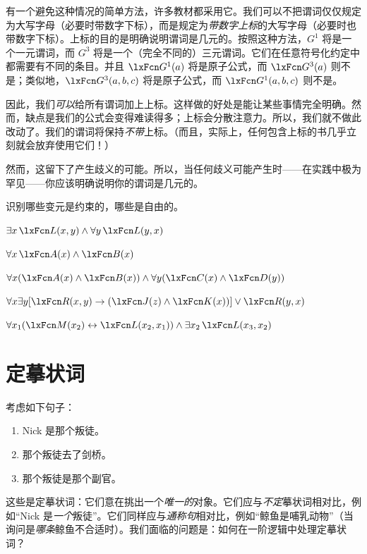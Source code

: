 有一个避免这种情况的简单方法，许多教材都采用它。我们可以不把谓词仅仅规定为大写字母（必要时带数字下标），而是规定为\emph{带数字上标}的大写字母（必要时也带数字下标）。上标的目的是明确说明谓词是几元的。按照这种方法，$G^1$ 将是一个一元谓词，而 $G^3$ 将是一个（完全不同的）三元谓词。它们在任意符号化约定中都需要有不同的条目。并且 $\atom{G^1}{a}$ 将是原子公式，而 $\atom{G^3}{a}$ 则不是；类似地，$\atom{G^3}{a,b,c}$ 将是原子公式，而 $\atom{G^1}{a,b,c}$ 则不是。

因此，我们\emph{可以}给所有谓词加上上标。这样做的好处是能让某些事情完全明确。然而，缺点是我们的公式会变得难读得多；上标会分散注意力。所以，我们就不做此改动了。我们的谓词将保持\emph{不带}上标。（而且，实际上，任何包含上标的书几乎立刻就会放弃使用它们！）

然而，这留下了产生歧义的可能。所以，当任何歧义可能产生时——在实践中极为罕见——你应该明确说明你的谓词是几元的。

\practiceproblems
\problempart
\label{pr.freeFOL}
识别哪些变元是约束的，哪些是自由的。
\begin{compactlist}
\item $\exists x\, \atom{L}{x,y} \eand \forall y\, \atom{L}{y,x}$
\item $\forall x\, \atom{A}{x} \eand \atom{B}{x}$
\item $\forall x (\atom{A}{x} \eand \atom{B}{x}) \eand \forall y(\atom{C}{x} \eand \atom{D}{y})$
\item $\forall x\exists y[\atom{R}{x,y} \eif (\atom{J}{z} \eand \atom{K}{x})] \eor \atom{R}{y,x}$
\item $\forall x_1(\atom{M}{x_2} \eiff \atom{L}{x_2,x_1}) \eand \exists x_2\,\atom{L}{x_3,x_2}$
\end{compactlist}

\chapter{定摹状词}\label{subsec.defdesc}
考虑如下句子：
	\begin{enumerate}
		\item\label{traitor1} Nick 是那个叛徒。
		\item\label{traitor2} 那个叛徒去了剑桥。
		\item\label{traitor3} 那个叛徒是那个副官。
	\end{enumerate}
这些是定摹状词：它们意在挑出一个\emph{唯一的}对象。它们应与\emph{不定}摹状词相对比，例如“Nick 是\emph{一个}叛徒”。它们同样应与\emph{通称句}相对比，例如“鲸鱼是哺乳动物”（当询问是\emph{哪条}鲸鱼不合适时）。我们面临的问题是：如何在一阶逻辑中处理定摹状词？

